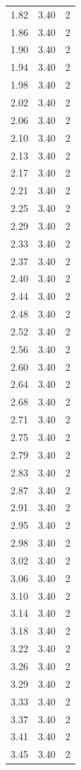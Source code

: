 \begin{longtable}{lrr}
  1.82 & 3.40 & 2 \\
  1.86 & 3.40 & 2 \\
  1.90 & 3.40 & 2 \\
  1.94 & 3.40 & 2 \\
  1.98 & 3.40 & 2 \\
  2.02 & 3.40 & 2 \\
  2.06 & 3.40 & 2 \\
  2.10 & 3.40 & 2 \\
  2.13 & 3.40 & 2 \\
  2.17 & 3.40 & 2 \\
  2.21 & 3.40 & 2 \\
  2.25 & 3.40 & 2 \\
  2.29 & 3.40 & 2 \\
  2.33 & 3.40 & 2 \\
  2.37 & 3.40 & 2 \\
  2.40 & 3.40 & 2 \\
  2.44 & 3.40 & 2 \\
  2.48 & 3.40 & 2 \\
  2.52 & 3.40 & 2 \\
  2.56 & 3.40 & 2 \\
  2.60 & 3.40 & 2 \\
  2.64 & 3.40 & 2 \\
  2.68 & 3.40 & 2 \\
  2.71 & 3.40 & 2 \\
  2.75 & 3.40 & 2 \\
  2.79 & 3.40 & 2 \\
  2.83 & 3.40 & 2 \\
  2.87 & 3.40 & 2 \\
  2.91 & 3.40 & 2 \\
  2.95 & 3.40 & 2 \\
  2.98 & 3.40 & 2 \\
  3.02 & 3.40 & 2 \\
  3.06 & 3.40 & 2 \\
  3.10 & 3.40 & 2 \\
  3.14 & 3.40 & 2 \\
  3.18 & 3.40 & 2 \\
  3.22 & 3.40 & 2 \\
  3.26 & 3.40 & 2 \\
  3.29 & 3.40 & 2 \\
  3.33 & 3.40 & 2 \\
  3.37 & 3.40 & 2 \\
  3.41 & 3.40 & 2 \\
  3.45 & 3.40 & 2 \\

\end{longtable}
